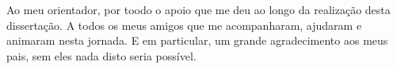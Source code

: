\acknowledgements

Ao meu orientador, por toodo o apoio que me deu ao longo da realização desta dissertação. A todos os meus amigos que me acompanharam, ajudaram e animaram nesta jornada. E em particular, um grande agradecimento aos meus pais, sem eles nada disto seria possível.
